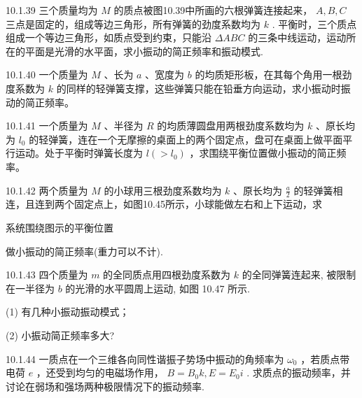 \begin{problem}{10.1.39}
三个质量均为 $M$ 的质点被图10.39中所画的六根弹簧连接起来， $A, B, C$ 三点是固定的，组成等边三角形，所有弹簧的劲度系数均为 $k$ . 平衡时，三个质点组成一个等边三角形，如质点受到约束，只能沿 $\Delta ABC$ 的三条中线运动，运动所在的平面是光滑的水平面，求小振动的简正频率和振动模式.
\begin{center}

\end{center}
\end{problem}
\clearpage


\begin{problem}{10.1.40}
一个质量为 $M$ 、长为 $a$ 、宽度为 $b$ 的均质矩形板，在其每个角用一根劲度系数为 $k$ 的同样的轻弹簧支撑，这些弹簧只能在铅垂方向运动，求小振动时振动的简正频率。
\end{problem}
\clearpage


\begin{problem}{10.1.41}
一个质量为 $M$ 、半径为 $R$ 的均质薄圆盘用两根劲度系数均为 $k$ 、原长均为 $l_0$ 的轻弹簧，连在一个无摩擦的桌面上的两个固定点，盘可在桌面上做平面平行运动。处于平衡时弹簧长度为 $l (>l_0)$ ，求围绕平衡位置做小振动的简正频率。
\end{problem}
\clearpage


\begin{problem}{10.1.42}
两个质量为 $M$ 的小球用三根劲度系数均为 $k$ 、原长均为 $\frac{a}{2}$ 的轻弹簧相连，且连到两个固定点上，如图10.45所示，小球能做左右和上下运动，求

系统围绕图示的平衡位置

做小振动的简正频率(重力可以不计).
\begin{center}

\end{center}
\end{problem}
\clearpage


\begin{problem}{10.1.43}
四个质量为 $m$ 的全同质点用四根劲度系数为 $k$ 的全同弹簧连起来, 被限制在一半径为 $b$ 的光滑的水平圆周上运动, 如图 10.47 所示.

(1) 有几种小振动振动模式；

(2) 小振动简正频率多大?
\begin{center}

\end{center}
\end{problem}
\clearpage


\begin{problem}{10.1.44}
一质点在一个三维各向同性谐振子势场中振动的角频率为 $\omega_0$ ，若质点带电荷 $e$ ，还受到均匀的电磁场作用， $B = B_0k, E = E_0i$ . 求质点的振动频率，并讨论在弱场和强场两种极限情况下的振动频率.
\end{problem}
\clearpage


